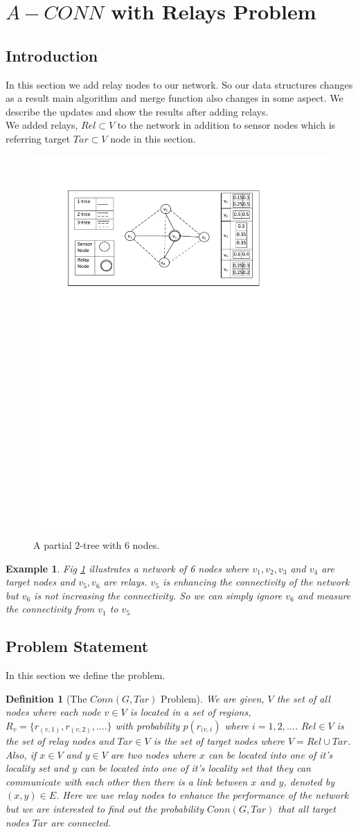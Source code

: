 \documentclass[12pt]{article}
\newtheorem*{defi}{Definition}
\newtheorem{exmp}{Example}[section]
\begin{document}
\section{$A-CONN$ with Relays Problem}
\subsection{Introduction}
In this section we add relay nodes to our network. So our data structures changes as a result main algorithm and merge function also changes in some aspect. We describe the updates and show the results after adding relays.\\
We added relays, $Rel\subset V$ to the network in addition to sensor nodes which is referring target $Tar\subset V$ node in this section.
\begin{figure}[h]

\centering
\includegraphics[width=6 in, height=2.5 in]{Relay.pdf}
 \caption{A partial \(2\)-tree with \(6\) nodes.
}
\label{fig:relay1}
\end{figure}
\begin{exmp}
\normalfont
Fig \ref{fig:relay1} illustrates a network of 6 nodes where $v_1,v_2,v_3$ and $v_4$ are target nodes and $v_5, v_6$ are relays. $v_5$ is enhancing the connectivity of the network but $v_6$ is not  increasing the connectivity. So we can simply ignore $v_6$ and measure the connectivity from $v_1$ to $v_5$
\end{exmp}
\subsection{Problem Statement}
In this section we define the problem.
\begin{defi}[The $Conn(G,Tar)$ Problem]
\normalfont
We are given, $V$ the set of all nodes where each node $v\in V$ is located in a set of regions, $R_v=\{r_{(v,1)},r_{(v,2)},....\}$  with probability $p(r_{(v,i})$ where $i=1,2,...$.
$Rel\in V$ is the set of relay nodes and $Tar\in V$ is the set of target nodes where $V=Rel\cup Tar$. Also, if $x\in V$ and $y\in V$ are two nodes where $x$ can be located into one of it's locality set and $y$ can be located into one of it's locality set that they can communicate with each other then there is a link between $x$ and $y$, denoted by $(x,y)\in E$. Here we use relay nodes to enhance the performance of the network but we are interested to find out the probability $Conn(G,Tar)$ that all target nodes $Tar$ are connected.
\end{defi}
\end{document}
